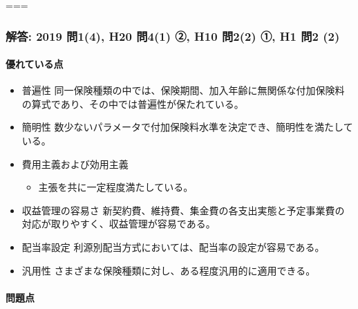 \documentclass[
]{article}
\providecommand{\tightlist}{%
  \setlength{\itemsep}{0pt}\setlength{\parskip}{0pt}}
\begin{document}
===

\hypertarget{ux89e3ux7b54-2019-ux554f14-h20-ux554f41-ux2461-h10-ux554f22-ux2460-h1-ux554f2-2}{%
\subsubsection{解答: 2019 問1(4), H20 問4(1) ②, H10 問2(2) ①, H1 問2
(2)}\label{ux89e3ux7b54-2019-ux554f14-h20-ux554f41-ux2461-h10-ux554f22-ux2460-h1-ux554f2-2}}

\hypertarget{ux512aux308cux3066ux3044ux308bux70b9}{%
\paragraph{優れている点}\label{ux512aux308cux3066ux3044ux308bux70b9}}

\begin{itemize}
\tightlist
\item
  普遍性
  同一保険種類の中では、保険期間、加入年齢に無関係な付加保険料の算式であり、その中では普遍性が保たれている。
\item
  簡明性
  数少ないパラメータで付加保険料水準を決定でき、簡明性を満たしている。
\item
  費用主義および効用主義

  \begin{itemize}
  \tightlist
  \item
    主張を共に一定程度満たしている。
  \end{itemize}
\item
  収益管理の容易さ
  新契約費、維持費、集金費の各支出実態と予定事業費の対応が取りやすく、収益管理が容易である。
\item
  配当率設定 利源別配当方式においては、配当率の設定が容易である。
\item
  汎用性 さまざまな保険種類に対し、ある程度汎用的に適用できる。
\end{itemize}

\hypertarget{ux554fux984cux70b9}{%
\paragraph{問題点}\label{ux554fux984cux70b9}}
\end{document}
